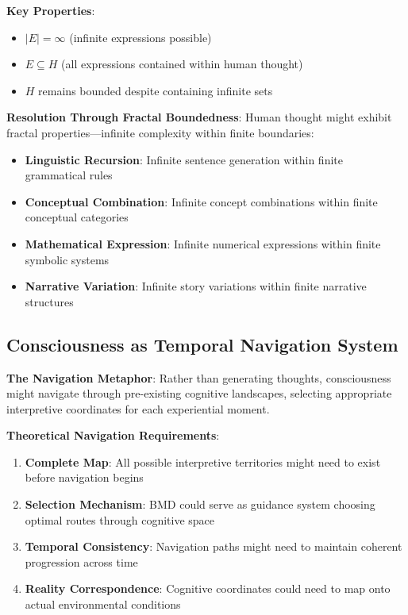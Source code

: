 \documentclass[12pt]{article}
\begin{document}
\textbf{Key Properties}:
\begin{itemize}
\item $|E| = \infty$ (infinite expressions possible)
\item $E \subseteq H$ (all expressions contained within human thought)
\item $H$ remains bounded despite containing infinite sets
\end{itemize}

\textbf{Resolution Through Fractal Boundedness}:
Human thought might exhibit fractal properties—infinite complexity within finite boundaries:
\begin{itemize}
\item \textbf{Linguistic Recursion}: Infinite sentence generation within finite grammatical rules
\item \textbf{Conceptual Combination}: Infinite concept combinations within finite conceptual categories
\item \textbf{Mathematical Expression}: Infinite numerical expressions within finite symbolic systems
\item \textbf{Narrative Variation}: Infinite story variations within finite narrative structures
\end{itemize}

\subsection{Consciousness as Temporal Navigation System}

\textbf{The Navigation Metaphor}: Rather than generating thoughts, consciousness might navigate through pre-existing cognitive landscapes, selecting appropriate interpretive coordinates for each experiential moment.

\textbf{Theoretical Navigation Requirements}:
\begin{enumerate}
\item \textbf{Complete Map}: All possible interpretive territories might need to exist before navigation begins
\item \textbf{Selection Mechanism}: BMD could serve as guidance system choosing optimal routes through cognitive space
\item \textbf{Temporal Consistency}: Navigation paths might need to maintain coherent progression across time
\item \textbf{Reality Correspondence}: Cognitive coordinates could need to map onto actual environmental conditions
\end{enumerate}
\end{document}
